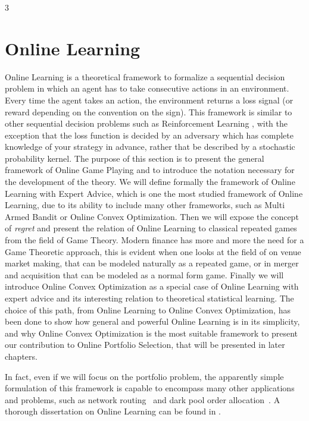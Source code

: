3\chapter{Online Learning}\label{ch:OnlineLearning}
Online Learning is a theoretical framework to formalize a sequential decision problem in which an agent has to take consecutive actions in an environment. Every time the agent takes an action, the environment returns a loss signal (or reward depending on the convention on the sign). This framework is similar to other sequential decision problems such as Reinforcement Learning \cite{sutton1998introduction}, with the exception that the loss function is decided by an adversary which has complete knowledge of your strategy in advance, rather that be described by a stochastic probability kernel.
The purpose of this section is to present the general framework of Online Game Playing and to introduce the notation necessary for the development of the theory. We will define formally the framework of Online Learning with Expert Advice, which is one the most studied framework of Online Learning, due to its ability to include many other frameworks, such as Multi Armed Bandit or Online Convex Optimization. 
Then we will expose the concept of \emph{regret} and present the relation of Online Learning to classical repeated games from the field of Game Theory. Modern finance has more and more the need for a Game Theoretic approach, this is evident when one looks at the field of on venue market making, that can be modeled naturally as a repeated game, or in merger and acquisition that can be modeled as a normal form game.
Finally we will introduce Online Convex Optimization as a special case of Online Learning with expert advice and its interesting relation to theoretical statistical learning. The choice of this path, from Online Learning to Online Convex Optimization, has been done to show how general and powerful Online Learning is in its simplicity, and why Online Convex Optimization is the most suitable framework to present our contribution to Online Portfolio Selection, that will be presented in later chapters.

In fact, even if we will focus on the portfolio problem, the apparently simple formulation of this framework is capable to encompass many other applications and problems, such as network routing~\cite{belmega2018online} and dark pool order allocation~\cite{agarwal2010optimal}. 
A thorough dissertation on Online Learning can be found in \cite{cesa2006prediction}.

